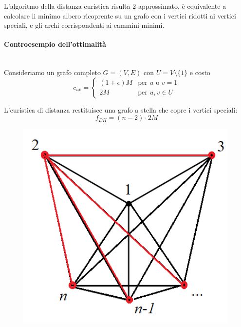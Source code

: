 \documentclass{article}
\begin{document}
L'algoritmo della distanza euristica risulta $2$-approssimato, è equivalente a calcolare li minimo albero ricoprente
su un grafo con i vertici ridotti ai vertici speciali, e gli archi corrispondenti ai cammini minimi.
\paragraph{Controesempio dell'ottimalità}\mbox{}\\
Consideriamo un grafo completo $G=(V,E)$ con $U = V\setminus \{1\}$ e costo
\[
    c_{uv}=
    \begin{cases}
        (1+\epsilon)M & \text{per } u \text{ o } v=1 \\
        2M            & \text{per }u,v\in U
    \end{cases}
\]

L'euristica di distanza restituisce una grafo a stella che copre i vertici speciali:
$$f_{DH} = (n-2)\cdot 2M$$
\begin{figure}[H]
    \centering
    \includegraphics[scale=0.5]{images/star0.png}
\end{figure}
\end{document}
